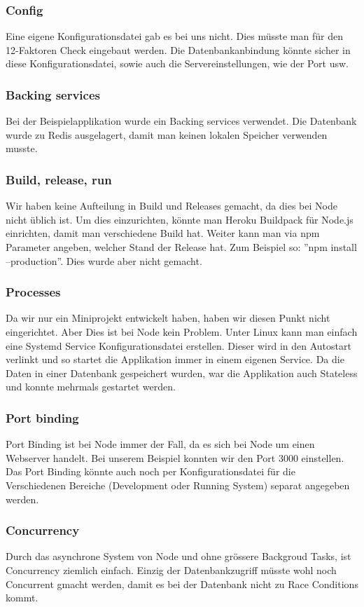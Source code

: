 \subsubsection{Config}
Eine eigene Konfigurationsdatei gab es bei uns nicht. Dies müsste man für den 12-Faktoren Check eingebaut werden. Die Datenbankanbindung könnte sicher in diese Konfigurationsdatei, sowie auch die Servereinstellungen, wie der Port usw.
\subsubsection{Backing services}
Bei der Beispielapplikation wurde ein Backing services verwendet. Die Datenbank wurde zu Redis ausgelagert, damit man keinen lokalen Speicher verwenden musste. 
\subsubsection{Build, release, run}
Wir haben keine Aufteilung in Build und Releases gemacht, da dies bei Node nicht üblich ist. Um dies einzurichten, könnte man Heroku Buildpack für Node.js einrichten, damit man verschiedene Build hat. Weiter kann man via npm Parameter angeben, welcher Stand der Release hat. Zum Beispiel so: ''npm install --production''. Dies wurde aber nicht gemacht.
\subsubsection{Processes}
Da wir nur ein Miniprojekt entwickelt haben, haben wir diesen Punkt nicht eingerichtet. Aber Dies ist bei Node kein Problem. Unter Linux kann man einfach eine Systemd Service Konfigurationsdatei erstellen. Dieser wird in den Autostart verlinkt und so startet die Applikation immer in einem eigenen Service. Da die Daten in einer Datenbank gespeichert wurden, war die Applikation auch Stateless und konnte mehrmals gestartet werden.
\subsubsection{Port binding}
Port Binding ist bei Node immer der Fall, da es sich bei Node um einen Webserver handelt. Bei unserem Beispiel konnten wir den Port 3000 einstellen. Das Port Binding könnte auch noch per Konfigurationsdatei für die Verschiedenen Bereiche (Development oder Running System) separat angegeben werden.
\subsubsection{Concurrency}
Durch das asynchrone System von Node und ohne grössere Backgroud Tasks, ist Concurrency ziemlich einfach. Einzig der Datenbankzugriff müsste wohl noch Concurrent gmacht werden, damit es bei der Datenbank nicht zu Race Conditions kommt.
